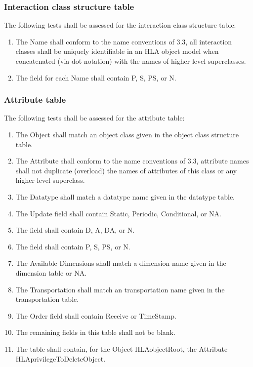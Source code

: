 \subsubsection{Interaction class structure table}
The following tests shall be assessed for the interaction class structure table:
\begin{enumerate}[label=\arabic*),leftmargin=42pt,labelsep=8pt,itemsep=1.2pt,topsep=2pt]
\item The Name shall conform to the name conventions of 3.3, all interaction classes shall be uniquely identifiable in an HLA object model when concatenated (via dot notation) with the names of higher-level superclasses.
\item The  field for each Name shall contain P, S, PS, or N.
\end{enumerate}

\subsubsection{Attribute table}
The following tests shall be assessed for the attribute table:

\newpage
\begin{enumerate}[label=\arabic*),leftmargin=42pt,labelsep=8pt,itemsep=1.2pt,topsep=0pt]
\item The Object shall match an object class given in the object class structure table.
\item The Attribute shall conform to the name conventions of 3.3, attribute names shall not duplicate (overload) the names of attributes of this class or any higher-level superclass.
\item The Datatype shall match a datatype name given in the datatype table.
\item The Update field shall contain Static, Periodic, Conditional, or NA.
\item The  field shall contain D, A, DA, or N.
\item The  field shall contain P, S, PS, or N.
\item The Available Dimensions shall match a dimension name given in the dimension table or NA.
\item The Transportation shall match an transportation name given in the transportation table.
\item The Order field shall contain Receive or TimeStamp.
\item The remaining fields in this table shall not be blank.
\item The table shall contain, for the Object HLAobjectRoot, the Attribute HLAprivilegeToDeleteObject.
\end{enumerate}

